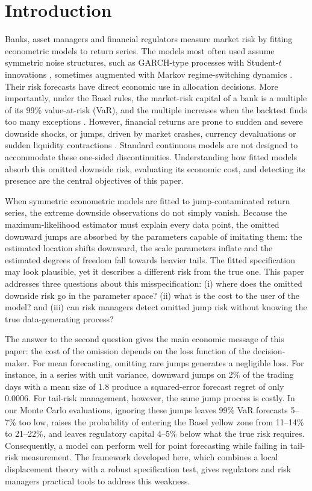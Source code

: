 \documentclass[11pt,a4paper]{article}
\theoremstyle{definition}
\theoremstyle{remark}
\begin{document}
\section{Introduction}\label{sec:intro}

Banks, asset managers and financial regulators measure market risk by fitting econometric models to return series. The models most often used assume symmetric noise structures, such as GARCH-type processes with Student-$t$ innovations \citep{bollerslev1986,ding1993,gjr1993}, sometimes augmented with Markov regime-switching dynamics \citep{hamilton1989,haas2004}. Their risk forecasts have direct economic use in allocation decisions. More importantly, under the Basel rules, the market-risk capital of a bank is a multiple of its 99\% value-at-risk (VaR), and the multiple increases when the backtest finds too many exceptions \citep{basel1996}. However, financial returns are prone to sudden and severe downside shocks, or jumps, driven by market crashes, currency devaluations or sudden liquidity contractions \citep{merton1976,eraker2003}. Standard continuous models are not designed to accommodate these one-sided discontinuities. Understanding how fitted models absorb this omitted downside risk, evaluating its economic cost, and detecting its presence are the central objectives of this paper.

When symmetric econometric models are fitted to jump-contaminated return series, the extreme downside observations do not simply vanish. Because the maximum-likelihood estimator must explain every data point, the omitted downward jumps are absorbed by the parameters capable of imitating them: the estimated location shifts downward, the scale parameters inflate and the estimated degrees of freedom fall towards heavier tails. The fitted specification may look plausible, yet it describes a different risk from the true one. This paper addresses three questions about this misspecification: (i) where does the omitted downside risk go in the parameter space? (ii) what is the cost to the user of the model? and (iii) can risk managers detect omitted jump risk without knowing the true data-generating process?

The answer to the second question gives the main economic message of this paper: the cost of the omission depends on the loss function of the decision-maker. For mean forecasting, omitting rare jumps generates a negligible loss. For instance, in a series with unit variance, downward jumps on 2\% of the trading days with a mean size of 1.8 produce a squared-error forecast regret of only $0.0006$. For tail-risk management, however, the same jump process is costly. In our Monte Carlo evaluations, ignoring these jumps leaves 99\% VaR forecasts 5--7\% too low, raises the probability of entering the Basel yellow zone from 11--14\% to 21--22\%, and leaves regulatory capital 4--5\% below what the true risk requires. Consequently, a model can perform well for point forecasting while failing in tail-risk measurement. The framework developed here, which combines a local displacement theory with a robust specification test, gives regulators and risk managers practical tools to address this weakness.
\end{document}
